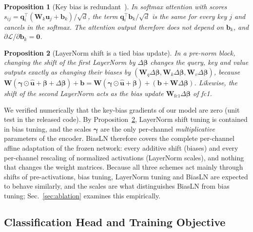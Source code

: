 \documentclass[fonts]{icst}
\newtheorem{proposition}{Proposition}
\begin{document}
\begin{proposition}[Key bias is redundant~\cite{namazifar2023bias}]
\label{prop:key}
In softmax attention with scores $s_{ij}=\mathbf{q}_i^\top(\mathbf{W}_k\mathbf{u}_j+\mathbf{b}_k)/\sqrt{d}$, the term $\mathbf{q}_i^\top\mathbf{b}_k/\sqrt{d}$ is the same for every key $j$ and cancels in the softmax. The attention output therefore does not depend on $\mathbf{b}_k$, and $\partial\mathcal{L}/\partial\mathbf{b}_k=\mathbf{0}$.
\end{proposition}

\begin{proposition}[LayerNorm shift is a tied bias update]
\label{prop:fold}
In a pre-norm block, changing the shift of the first LayerNorm by $\Delta\boldsymbol{\beta}$ changes the query, key and value outputs exactly as changing their biases by $(\mathbf{W}_q\Delta\boldsymbol{\beta},\mathbf{W}_k\Delta\boldsymbol{\beta},\mathbf{W}_v\Delta\boldsymbol{\beta})$, because $\mathbf{W}(\boldsymbol{\gamma}\odot\hat{\mathbf{u}}+\boldsymbol{\beta}+\Delta\boldsymbol{\beta})+\mathbf{b}=\mathbf{W}(\boldsymbol{\gamma}\odot\hat{\mathbf{u}}+\boldsymbol{\beta})+(\mathbf{b}+\mathbf{W}\Delta\boldsymbol{\beta})$. Likewise, the shift of the second LayerNorm acts as the bias update $\mathbf{W}_{\mathrm{fc1}}\Delta\boldsymbol{\beta}$ of fc1.
\end{proposition}

We verified numerically that the key-bias gradients of our model are zero (unit test in the released code). By Proposition~\ref{prop:fold}, LayerNorm shift tuning is contained in bias tuning, and the scales $\boldsymbol{\gamma}$ are the only per-channel \emph{multiplicative} parameters of the encoder. BiasLN therefore covers the complete per-channel affine adaptation of the frozen network: every additive shift (biases) and every per-channel rescaling of normalized activations (LayerNorm scales), and nothing that changes the weight matrices. Because all three schemes act mainly through shifts of pre-activations, bias tuning, LayerNorm tuning and BiasLN are expected to behave similarly, and the scales are what distinguishes BiasLN from bias tuning; Sec.~\ref{sec:ablation} examines this empirically.

\subsection{Classification Head and Training Objective}
\end{document}
